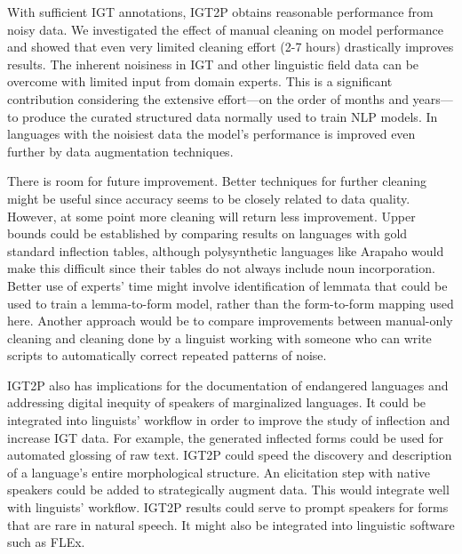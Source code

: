 With sufficient IGT annotations, IGT2P obtains reasonable performance from noisy data. 
We investigated the effect of manual cleaning on model performance and showed that even very limited cleaning effort (2-7 hours) drastically improves results. The inherent noisiness in IGT and other linguistic field data can be overcome with limited input from domain experts. This is a significant contribution considering the extensive effort---on the order of months and years---to produce the curated structured data normally used to train NLP models. 
In languages with the noisiest data the model's performance is improved even further by data augmentation techniques.

There is room for future improvement. Better techniques for further cleaning might be useful since accuracy seems to be closely related to data quality. However, at some point more cleaning will return less improvement. Upper bounds could be established by comparing results on languages with gold standard inflection tables, although polysynthetic languages like Arapaho would make this difficult since their tables do not always include noun incorporation. Better use of experts' time might involve identification of lemmata that could be used to train a lemma-to-form model, rather than the form-to-form mapping used here. Another approach would be to compare improvements between manual-only cleaning and cleaning done by a linguist working with someone who can write scripts to automatically correct repeated patterns of noise. 

IGT2P also has implications for the documentation of endangered languages and addressing digital inequity of speakers of marginalized languages. It could be integrated into linguists’ workflow in order to improve the study of inflection and increase IGT data. For example, the generated inflected forms could be used for automated glossing of raw text. IGT2P could speed the discovery and description of a language's entire morphological structure. An elicitation step with native speakers could be added to strategically augment data. This would integrate well with linguists’ workflow. IGT2P results could serve to prompt speakers for forms that are rare in natural speech. It might also be integrated into linguistic software such as FLEx. 
